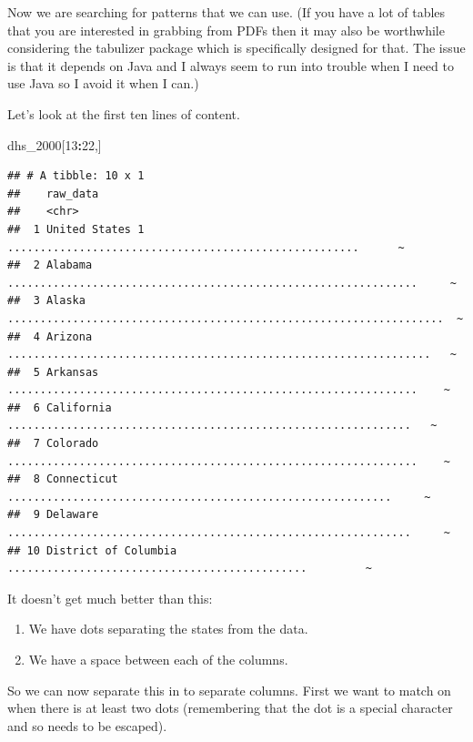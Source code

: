 \documentclass[
]{book}
\newenvironment{Shaded}{\begin{snugshade}}{\end{snugshade}}
\newcommand{\DecValTok}[1]{\textcolor[rgb]{0.00,0.00,0.81}{#1}}
\newcommand{\NormalTok}[1]{#1}
\newcommand{\OperatorTok}[1]{\textcolor[rgb]{0.81,0.36,0.00}{\textbf{#1}}}
\providecommand{\tightlist}{%
  \setlength{\itemsep}{0pt}\setlength{\parskip}{0pt}}
\begin{document}
Now we are searching for patterns that we can use. (If you have a lot of tables that you are interested in grabbing from PDFs then it may also be worthwhile considering the tabulizer package which is specifically designed for that. The issue is that it depends on Java and I always seem to run into trouble when I need to use Java so I avoid it when I can.)

Let's look at the first ten lines of content.

\begin{Shaded}
\begin{Highlighting}[]
\NormalTok{dhs_}\DecValTok{2000}\NormalTok{[}\DecValTok{13}\OperatorTok{:}\DecValTok{22}\NormalTok{,]}
\end{Highlighting}
\end{Shaded}

\begin{verbatim}
## # A tibble: 10 x 1
##    raw_data                                                                     
##    <chr>                                                                        
##  1 United States 1 ......................................................      ~
##  2 Alabama ...............................................................     ~
##  3 Alaska ...................................................................  ~
##  4 Arizona .................................................................   ~
##  5 Arkansas ...............................................................    ~
##  6 California ..............................................................   ~
##  7 Colorado ...............................................................    ~
##  8 Connecticut ...........................................................     ~
##  9 Delaware ..............................................................     ~
## 10 District of Columbia ..............................................         ~
\end{verbatim}

It doesn't get much better than this:

\begin{enumerate}
\def\labelenumi{\arabic{enumi}.}
\tightlist
\item
  We have dots separating the states from the data.
\item
  We have a space between each of the columns.
\end{enumerate}

So we can now separate this in to separate columns. First we want to match on when there is at least two dots (remembering that the dot is a special character and so needs to be escaped).
\end{document}
